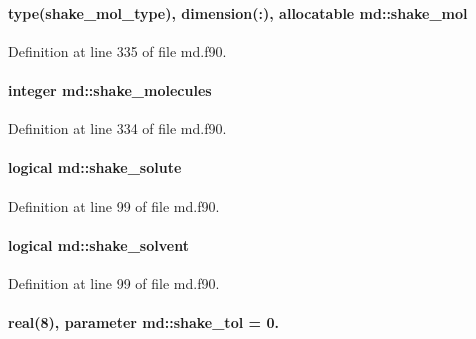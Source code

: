 \hypertarget{classmd_aef5b63a2cb534bf9e801eade7338f980}{
\paragraph[{shake\-\_\-mol}]{\setlength{\rightskip}{0pt plus 5cm}type({\bf shake\-\_\-mol\-\_\-type}), dimension(\-:), allocatable md\-::shake\-\_\-mol}}\label{classmd_aef5b63a2cb534bf9e801eade7338f980}


Definition at line 335 of file md.\-f90.

\hypertarget{classmd_a00c71fcab952096238416ea504436e39}{
\paragraph[{shake\-\_\-molecules}]{\setlength{\rightskip}{0pt plus 5cm}integer md\-::shake\-\_\-molecules}}\label{classmd_a00c71fcab952096238416ea504436e39}


Definition at line 334 of file md.\-f90.

\hypertarget{classmd_a4f71ea0c12f02331ebd77dba932134b5}{
\paragraph[{shake\-\_\-solute}]{\setlength{\rightskip}{0pt plus 5cm}logical md\-::shake\-\_\-solute}}\label{classmd_a4f71ea0c12f02331ebd77dba932134b5}


Definition at line 99 of file md.\-f90.

\hypertarget{classmd_a7a7e6cd21f89e488161401317fd48560}{
\paragraph[{shake\-\_\-solvent}]{\setlength{\rightskip}{0pt plus 5cm}logical md\-::shake\-\_\-solvent}}\label{classmd_a7a7e6cd21f89e488161401317fd48560}


Definition at line 99 of file md.\-f90.

\hypertarget{classmd_a026535969397ae3013660c511eaf0dea}{
\paragraph[{shake\-\_\-tol}]{\setlength{\rightskip}{0pt plus 5cm}real(8), parameter md\-::shake\-\_\-tol = 0.}}\label{classmd_a026535969397ae3013660c511eaf0dea}


